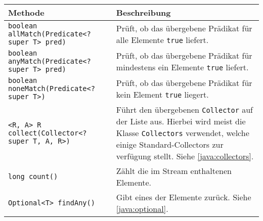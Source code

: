 			\begin{sidewaystable}
				\centering
				\begin{tabular}{p{8cm} | p{13cm}}
					Methode                                                                                          & Beschreibung                                                                                                                                                                                                  \\
					\hline
					\texttt{boolean allMatch(Predicate<? super T> pred)}                                             & Prüft, ob das übergebene Prädikat für alle Elemente \texttt{true} liefert.                                                                                                                                    \\
					\texttt{boolean anyMatch(Predicate<? super T> pred)}                                             & Prüft, ob das übergebene Prädikat für mindestens ein Elemente \texttt{true} liefert.                                                                                                                          \\
					\texttt{boolean noneMatch(Predicate<? super T>)}                                                 & Prüft, ob das übergebene Prädikat für kein Element \texttt{true} liegert.                                                                                                                                     \\
					\texttt{<R, A> R collect(Collector<? super T, A, R>)}                                            & Führt den übergebenen \texttt{Collector} auf der Liste aus. Hierbei wird meist die Klasse \texttt{Collectors} verwendet, welche einige Standard-Collectors zur verfügung stellt. Siehe \ref{java:collectors}. \\
					\texttt{long count()}                                                                            & Zählt die im Stream enthaltenen Elemente.                                                                                                                                                                     \\
					\texttt{Optional<T> findAny()}                                                                   & Gibt eines der Elemente zurück. Siehe \ref{java:optional}.                                                                                                                                                    \\

\end{tabular}
\end{sidewaystable}
